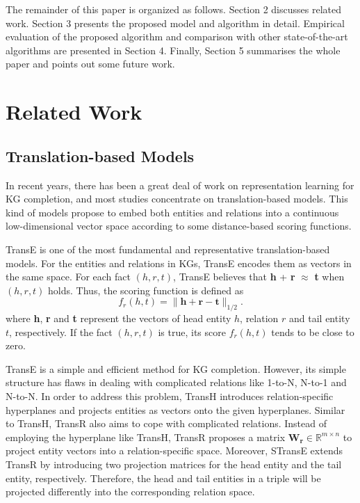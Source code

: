 \documentclass[11pt,a4paper]{article}
\begin{document}
The remainder of this paper is organized as follows. Section 2
discusses related work. Section 3 presents the proposed model and
algorithm in detail. Empirical evaluation of the proposed algorithm
and comparison with other state-of-the-art algorithms are presented
in Section 4. Finally, Section 5 summarises the whole paper and
points out some future work.


\section{Related Work}

\subsection{Translation-based Models}

In recent years, there has been a great deal of work on
representation learning for KG completion, and most studies
concentrate on translation-based models. This kind of models
propose to embed both entities and relations into a continuous
low-dimensional vector space according to some distance-based
scoring functions.

TransE \cite{bordes2013translating} is one of the most fundamental
and representative translation-based models. For the entities and
relations in KGs, TransE encodes them as vectors in the same space.
For each fact $(h, r, t)$, TransE believes that \textbf{h} +
\textbf{r} $\approx$ \textbf{t} when $(h, r, t)$ holds. Thus, the
scoring function is defined as
\begin{equation}
f_{r}\left(h,t\right) = \parallel \mathbf{h} + \mathbf{r} -
\mathbf{t} \parallel_{1/2}.
\end{equation}
where \textbf{h}, \textbf{r} and \textbf{t} represent the vectors of
head entity $h$, relation $r$ and tail entity $t$, respectively. If
the fact $(h, r, t)$ is true, its score $f_{r}\left(h,t\right)$
tends to be close to zero.

TransE is a simple and efficient method for KG completion. However,
its simple structure has flaws in dealing with complicated relations
like 1-to-N, N-to-1 and N-to-N.
In order to address this problem, TransH
\cite{wang2014knowledge} introduces relation-specific hyperplanes
and projects entities as vectors onto the given hyperplanes. Similar
to TransH, TransR \cite{lin2015learning} also aims to cope with
complicated relations. Instead of employing the hyperplane like TransH, TransR proposes a
matrix $\mathbf{W}_{\mathbf{r}} \mathbf{\in}
\mathbb{R}^{m{\times}n}$ to project entity vectors into a
relation-specific space. Moreover, STransE \cite{nguyen2016stranse}
extends TransR by introducing two projection matrices for the head
entity and the tail entity, respectively. Therefore, the head and
tail entities in a triple will be projected differently into the
corresponding relation space.
\end{document}
